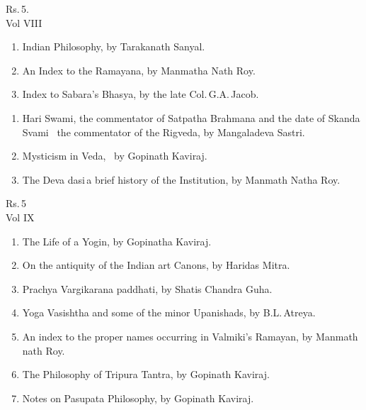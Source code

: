 \documentclass[11pt, openany]{book}
\begin{document}
\begin{sloppypar}
\hfill Rs.\,5.\\

\noindent Vol VIII\textendash 
\vspace{-2mm}

\begin{enumerate}[\indent(a)]
\setlength{\itemsep}{0pt}
\setlength{\parskip}{0pt}
\item Indian Philosophy, by Tarakanath Sanyal.
\item An Index to the Ramayana, by Manmatha Nath Roy.
\item Index to Sabara's Bhasya, by the late Col.\,G.A.\,Jacob.
\end{enumerate}

\end{sloppypar}

\newpage

\begin{sloppypar}
\begin{enumerate}[\indent(a)]
\setlength{\itemsep}{0pt}
\setlength{\parskip}{0pt}
\addtocounter{enumi}{3}
\item Hari Swami, the commentator of Satpatha Brahmana and the date of Skanda Svami ~the commentator of the Rigveda, by Mangaladeva Sastri.
\item Mysticism in Veda, ~by Gopinath Kaviraj.
\item The Deva dasi\textendash \,a brief history of the Institution, by Manmath Natha Roy.
\end{enumerate}
\vspace{-4mm}

\hfill Rs.\,5\\

\noindent Vol IX\textendash 
\vspace{-2mm}

\begin{enumerate}[\indent(a)]
\setlength{\itemsep}{0pt}
\setlength{\parskip}{0pt}
\item The Life of a Yogin, by Gopinatha Kaviraj.
\item On the antiquity of the Indian art Canons, by Haridas Mitra.
\item Prachya Vargikarana paddhati, by Shatis Chandra Guha.
\item Yoga Vasishtha and some of the minor Upanishads, by B.L.\,Atreya.
\item An index to the proper names occurring in Valmiki's Ramayan, by Manmath nath Roy.
\item The Philosophy of Tripura Tantra, by Gopinath Kaviraj.
\item Notes on Pasupata Philosophy, by Gopinath Kaviraj.
\end{enumerate}
\vspace{4mm}
\end{sloppypar}
\end{document}
